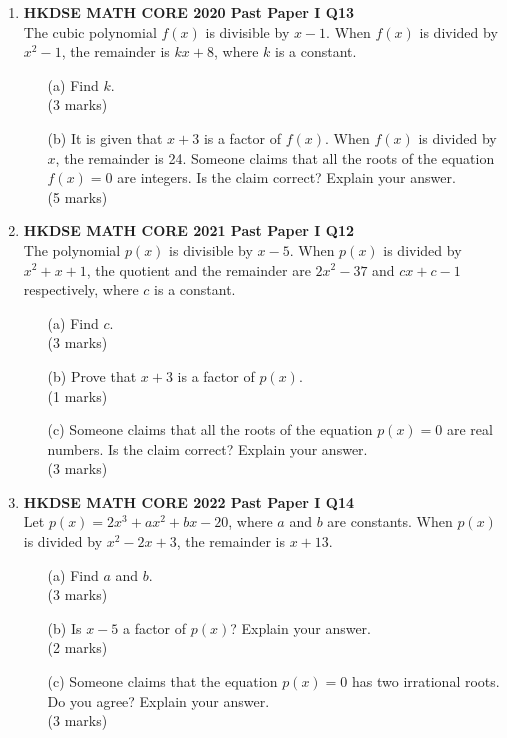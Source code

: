 \documentclass[12pt]{article}
\begin{document}
\begin{enumerate}
	\item \textbf{HKDSE MATH CORE 2020 Past Paper I Q13}\\
	The cubic polynomial $f(x)$ is divisible by $x-1$. When $f(x)$ is divided by $x^2-1$, the remainder is $kx+8$, where $k$ is a constant.
	\begin{enumerate}
		\item[(a)] Find $k$. \\(3 marks)
		\item[(b)] It is given that $x+3$ is a factor of $f(x)$. When $f(x)$ is divided by $x$, the remainder is 24. Someone claims that all the roots of the equation $f(x) = 0$ are integers. Is the claim correct? Explain your answer. \\(5 marks)
	\end{enumerate}

	\item \textbf{HKDSE MATH CORE 2021 Past Paper I Q12}\\	
	The polynomial $p(x)$ is divisible by $x - 5$. When $p(x)$ is divided by $x^2 + x + 1$, the quotient and the remainder are $2x^2 - 37$ and $cx + c - 1$ respectively, where $c$ is a constant.
	\begin{enumerate}
		\item[(a)] Find $c$. \\(3 marks)
		\item[(b)] Prove that $x+3$ is a factor of $p(x)$. \\(1 marks)
		\item[(c)] Someone claims that all the roots of the equation $p(x) = 0$ are real numbers. Is the claim correct? Explain your answer. \\(3 marks)
	\end{enumerate}

	\item \textbf{HKDSE MATH CORE 2022 Past Paper I Q14}\\
	Let $p(x) = 2x^3 + ax^2 + bx - 20$, where $a$ and $b$ are constants. When $p(x)$ is divided by $x^2 - 2x + 3$, the remainder is $x + 13$.
	\begin{enumerate}
		\item[(a)] Find $a$ and $b$. \\(3 marks)
		\item[(b)] Is $x - 5$ a factor of $p(x)$? Explain your answer. \\(2 marks)
		\item[(c)] Someone claims that the equation $p(x) = 0$ has two irrational roots. Do you agree? Explain your answer. \\(3 marks)
	\end{enumerate}



\end{enumerate}
\end{document}
